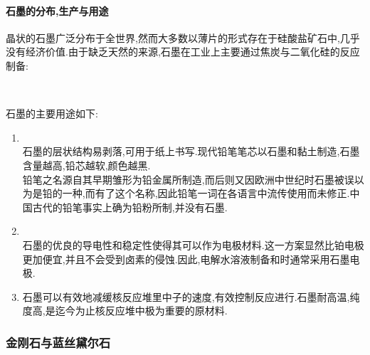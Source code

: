 \documentclass{ctexart}
\begin{document}
\paragraph{石墨的分布,生产与用途}
晶状的石墨广泛分布于全世界,然而大多数以薄片的形式存在于硅酸盐矿石中,几乎没有经济价值.由于缺乏天然的来源,石墨在工业上主要通过焦炭与二氧化硅的反应制备:
\begin{center}
    \\
\end{center}
石墨的主要用途如下:
\begin{enumerate}[label=\tbf{\arabic*.},topsep=0pt,parsep=0pt,itemsep=0pt,partopsep=0pt]
    \item {}\\
        石墨的层状结构易剥落,可用于纸上书写.现代铅笔笔芯以石墨和黏土制造,石墨含量越高,铅芯越软,颜色越黑.\\
        铅笔之名源自其早期雏形为铅金属所制造,而后则又因欧洲中世纪时石墨被误以为是铅的一种,而有了这个名称,因此铅笔一词在各语言中流传使用而未修正.中国古代的铅笔事实上确为铅粉所制,并没有石墨.
    \item {}\\
        石墨的优良的导电性和稳定性使得其可以作为电极材料.这一方案显然比铂电极更加便宜,并且不会受到卤素的侵蚀.因此,电解水溶液制备和时通常采用石墨电极.
    \item {}
        石墨可以有效地减缓核反应堆里中子的速度,有效控制反应进行.石墨耐高温,纯度高,是迄今为止核反应堆中极为重要的原材料.
\end{enumerate}
\subsubsection{金刚石与蓝丝黛尔石}
\end{document}
